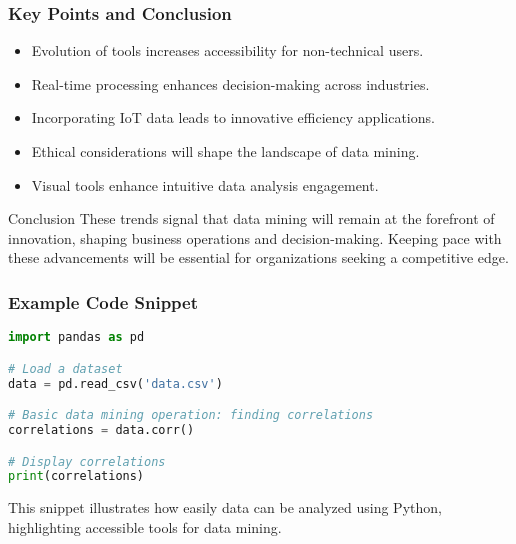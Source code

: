 \documentclass[aspectratio=169]{beamer}
\begin{document}
\begin{frame}[fragile]
    \frametitle{Key Points and Conclusion}
    \begin{itemize}
        \item Evolution of tools increases accessibility for non-technical users.
        \item Real-time processing enhances decision-making across industries.
        \item Incorporating IoT data leads to innovative efficiency applications.
        \item Ethical considerations will shape the landscape of data mining.
        \item Visual tools enhance intuitive data analysis engagement.
    \end{itemize}
    \begin{block}{Conclusion}
        These trends signal that data mining will remain at the forefront of innovation, shaping business operations and decision-making.
        Keeping pace with these advancements will be essential for organizations seeking a competitive edge.
    \end{block}
\end{frame}

\begin{frame}[fragile]
    \frametitle{Example Code Snippet}
    \begin{lstlisting}[language=Python]
import pandas as pd

# Load a dataset
data = pd.read_csv('data.csv')

# Basic data mining operation: finding correlations
correlations = data.corr()

# Display correlations
print(correlations)
    \end{lstlisting}
    \begin{block}{}
        This snippet illustrates how easily data can be analyzed using Python, highlighting accessible tools for data mining.
    \end{block}
\end{frame}
\end{document}
